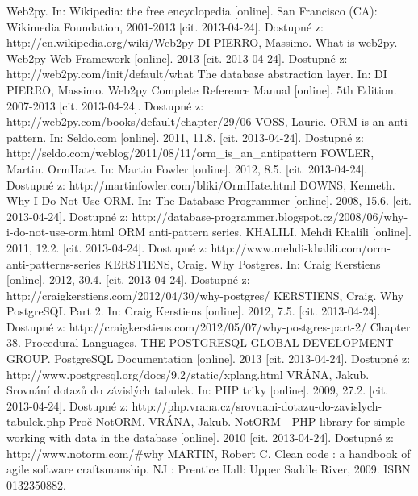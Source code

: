 \documentclass[ing,male,java,dept456]{diploma}						%
\begin{document}
\begin{thebibliography}{99}
 Web2py. In: Wikipedia: the free encyclopedia [online]. San Francisco (CA): Wikimedia Foundation, 2001-2013 [cit. 2013-04-24]. Dostupné z: http://en.wikipedia.org/wiki/Web2py
 DI PIERRO, Massimo. What is web2py. Web2py Web Framework [online]. 2013 [cit. 2013-04-24]. Dostupné z: http://web2py.com/init/default/what
 The database abstraction layer. In: DI PIERRO, Massimo. Web2py Complete Reference Manual [online]. 5th Edition. 2007-2013 [cit. 2013-04-24]. Dostupné z: http://web2py.com/books/default/chapter/29/06
 VOSS, Laurie. ORM is an anti-pattern. In: Seldo.com [online]. 2011, 11.8. [cit. 2013-04-24]. Dostupné z: http://seldo.com/weblog/2011/08/11/orm\_is\_an\_antipattern
 FOWLER, Martin. OrmHate. In: Martin Fowler [online]. 2012, 8.5. [cit. 2013-04-24]. Dostupné z: http://martinfowler.com/bliki/OrmHate.html
 DOWNS, Kenneth. Why I Do Not Use ORM. In: The Database Programmer [online]. 2008, 15.6. [cit. 2013-04-24]. Dostupné z: http://database-programmer.blogspot.cz/2008/06/why-i-do-not-use-orm.html
 ORM anti-pattern series. KHALILI. Mehdi Khalili [online]. 2011, 12.2. [cit. 2013-04-24]. Dostupné z: http://www.mehdi-khalili.com/orm-anti-patterns-series
 KERSTIENS, Craig. Why Postgres. In: Craig Kerstiens [online]. 2012, 30.4. [cit. 2013-04-24]. Dostupné z: http://craigkerstiens.com/2012/04/30/why-postgres/
 KERSTIENS, Craig. Why PostgreSQL Part 2. In: Craig Kerstiens [online]. 2012, 7.5. [cit. 2013-04-24]. Dostupné z: http://craigkerstiens.com/2012/05/07/why-postgres-part-2/
 Chapter 38. Procedural Languages. THE POSTGRESQL GLOBAL DEVELOPMENT GROUP. PostgreSQL Documentation [online]. 2013 [cit. 2013-04-24]. Dostupné z: http://www.postgresql.org/docs/9.2/static/xplang.html
 VRÁNA, Jakub. Srovnání dotazů do závislých tabulek. In: PHP triky [online]. 2009, 27.2. [cit. 2013-04-24]. Dostupné z: http://php.vrana.cz/srovnani-dotazu-do-zavislych-tabulek.php
 Proč NotORM. VRÁNA, Jakub. NotORM - PHP library for simple working with data in the database [online]. 2010 [cit. 2013-04-24]. Dostupné z: http://www.notorm.com/\#why
 MARTIN, Robert C. Clean code : a handbook of agile software craftsmanship. NJ : Prentice Hall: Upper Saddle River, 2009. ISBN 0132350882.
\end{thebibliography}


\appendix
\end{document}
